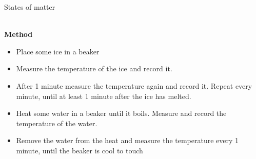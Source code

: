 \begin{fexperiment}{States of matter}
{\begin{minipage}{0.8\textwidth}
\begin{figure}[H]
\end{figure}
\end{minipage} \\

\label{m38736*eip-862}\noindent{}\textbf{Method}
\label{m38736*id9872}\begin{itemize}[noitemsep]
            \item Place some ice in a beaker\item Measure the temperature of the ice and record it.\item After 1 minute measure the temperature again and record it. Repeat every minute, until at least 1 minute after the ice has melted.\item Heat some water in a beaker until it boils. Measure and record the temperature of the water.\item Remove the water from the heat and measure the temperature every 1 minute, until the beaker is cool to touch\end{itemize}

}
\end{fexperiment}
